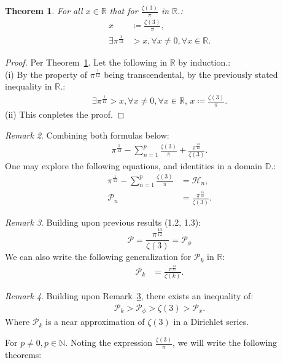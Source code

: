 \documentclass[10pt]{article}
\theoremstyle{plain}
\newtheorem{theorem}{Theorem}[section]
\theoremstyle{definition}
\theoremstyle{remark}
\newtheorem{remark}[theorem]{Remark}
\begin{document}
\begin{theorem}
\label{theo:first-zeta}
For all $x \in \mathbb{R}$ that for $\frac{\zeta(3)}{\pi}$ in $\mathbb{R}$.:
\begin{align*}
	x &\coloneq \frac{\zeta(3)}{\pi},\\
	\exists \pi^{\frac{1}{12}} &> x, \forall x \neq 0, \forall x \in \mathbb{R}.
\end{align*}
\end{theorem}
\begin{proof}
Per Theorem~\ref{theo:first-zeta}. Let the following in $\mathbb{R}$ by induction.:\\(i) By the property of $\pi^{\frac{1}{12}}$ being transcendental, by the previously stated inequality in $\mathbb{R}.$:
\begin{align*}
		\exists \pi^{\frac{1}{12}} > x, \forall x \neq 0, \forall x \in \mathbb{R}, \, x \coloneq \frac{\zeta(3)}{\pi}.
\end{align*}
(ii) This conpletes the proof.
\end{proof}
\begin{remark}
	\label{remark:sum-both}
	Combining both formulas below:
	\begin{align*}
		\pi^{\frac{1}{12}} - \sum_{n=1}^{p}\frac{\zeta(3)}{\pi} + \frac{\pi^{\frac{13}{12}}}{\zeta(3)}.
	\end{align*}
	One may explore the following equations, and identities in a domain $\mathbb{D}.$:
	\begin{align*}
		\pi^{\frac{1}{12}} - \sum_{n=1}^{p}\frac{\zeta(3)}{\pi} &= \mathcal{H}_n,\\
		\mathcal{P}_n &= \frac{\pi^{\frac{13}{12}}}{\zeta(3)}.
	\end{align*}
\end{remark}
\begin{remark}
\label{remark:frac-zeta}
	Building upon previous results (1.2, 1.3):
	\begin{equation}
		\mathcal{P} = \frac{\pi^{\frac{13}{12}}}{\zeta(3)} = \mathcal{P}_\phi
	\end{equation}
	We can also write the following generalization for $\mathcal{P}_k$ in $\mathbb{R}$:
	\begin{align*}
		\mathcal{P}_k &= \frac{\pi^{\frac{13}{12}}}{\zeta(k)}.
	\end{align*}
\end{remark}
\begin{remark}
	Building upon Remark~\ref{remark:frac-zeta}, there exists an inequality of:
	\begin{align*}
		\mathcal{P}_k > \mathcal{P}_\phi > \zeta(3) > \mathcal{P}_x. 
	\end{align*}
	Where $\mathcal{P}_k$ is a near approximation of $\zeta(3)$ in a Dirichlet series.
\end{remark} For $p \neq 0, p \in \mathbb{N}$. Noting the expression $\frac{\zeta(3)}{\pi}$, we will write the following theorems:
\end{document}
